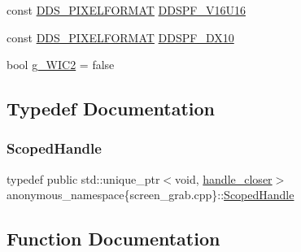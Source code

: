 \begin{DoxyCompactItemize}
\item 
const \mbox{\hyperlink{structanonymous__namespace_02screen__grab_8cpp_03_1_1_d_d_s___p_i_x_e_l_f_o_r_m_a_t}{D\+D\+S\+\_\+\+P\+I\+X\+E\+L\+F\+O\+R\+M\+AT}} \mbox{\hyperlink{namespaceanonymous__namespace_02screen__grab_8cpp_03_ad2007e8590c94da31c60d443d6b94c60}{D\+D\+S\+P\+F\+\_\+\+V16\+U16}}
\item 
const \mbox{\hyperlink{structanonymous__namespace_02screen__grab_8cpp_03_1_1_d_d_s___p_i_x_e_l_f_o_r_m_a_t}{D\+D\+S\+\_\+\+P\+I\+X\+E\+L\+F\+O\+R\+M\+AT}} \mbox{\hyperlink{namespaceanonymous__namespace_02screen__grab_8cpp_03_a19039f75bb2c7d22ba53da0230a34dcb}{D\+D\+S\+P\+F\+\_\+\+D\+X10}}
\item 
bool \mbox{\hyperlink{namespaceanonymous__namespace_02screen__grab_8cpp_03_aec5aa7341163ab3b613da3e0af287f9f}{g\+\_\+\+W\+I\+C2}} = false
\end{DoxyCompactItemize}


\subsection{Typedef Documentation}
\mbox{\label{namespaceanonymous__namespace_02screen__grab_8cpp_03_acdf0b72bf6ce17c9cc2dfb41f21e4706}} 
\subsubsection{\texorpdfstring{Scoped\+Handle}{ScopedHandle}}
{\footnotesize\ttfamily typedef public std\+::unique\+\_\+ptr$<$void, \mbox{\hyperlink{structanonymous__namespace_02screen__grab_8cpp_03_1_1handle__closer}{handle\+\_\+closer}}$>$ anonymous\+\_\+namespace\{screen\+\_\+grab.\+cpp\}\+::\mbox{\hyperlink{namespaceanonymous__namespace_02screen__grab_8cpp_03_acdf0b72bf6ce17c9cc2dfb41f21e4706}{Scoped\+Handle}}}



\subsection{Function Documentation}
\mbox{\label{namespaceanonymous__namespace_02screen__grab_8cpp_03_a8499ec768dea9a4e1a337f2a6bb401db}} 
